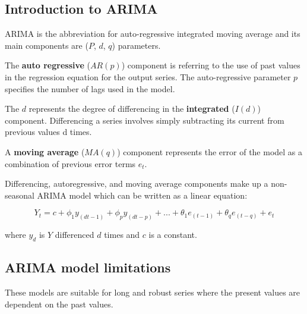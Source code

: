\documentclass{article}
\begin{document}
\subsection{Introduction to ARIMA}
ARIMA is the abbreviation for auto-regressive integrated moving average and its main components are ($P$, $d$, $q$) parameters.

The \textbf{auto regressive} ($AR(p)$) component is referring to the use of past values in the regression equation for the output series. The auto-regressive parameter $p$ specifies the number of lags used in the model. 

The $d$ represents the degree of differencing in the \textbf{integrated} ($I(d)$) component. Differencing a series involves simply subtracting its current from previous values d times.

A \textbf{moving average} ($MA(q)$) component represents the error of the model as a combination of previous error terms $e_t$.
 
Differencing, autoregressive, and moving average components make up a non-seasonal ARIMA model which can be written as a linear equation:

\begin{equation}
Y_t=c+\phi_1 y_(d t-1)+\phi_p y_(d t-p)+...+\theta_1 e_(t-1)+\theta_q e_(t-q)+e_t
\end{equation}

where $y_d$ is $Y$ differenced $d$ times and $c$ is a constant.

\subsection{ARIMA model limitations}
These models are suitable for long and robust series where the present values are dependent on the past values.
 
\end{document}

